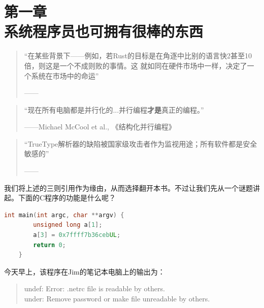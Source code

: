 \chapter{第一章\\系统程序员也可拥有很棒的东西}

\begin{quote}
    “在某些背景下------例如，若Rust的目标是在角逐中比别的语言快2甚至10倍，则这是一个不成则败的事情。这
    就如同在硬件市场中一样，决定了一个系统在市场中的命运”
    \begin{flushright}
        ------
    \end{flushright}
\end{quote}
\begin{quote}
    “现在所有电脑都是并行化的...并行编程\textbf{才是}真正的编程。”
    \begin{flushright}
        ------Michael McCool et al., 《结构化并行编程》
    \end{flushright}
\end{quote}
\begin{quote}
    “TrueType解析器的缺陷被国家级攻击者作为监视用途；所有软件都是安全敏感的”
    \begin{flushright}
        ------
    \end{flushright}
\end{quote}

我们将上述的三则引用作为缘由，从而选择翻开本书。不过让我们先从一个谜题讲起。下面的C程序的功能是什么呢？
\begin{lstlisting}[language=c]
    int main(int argc, char **argv) {
        unsigned long a[1];
        a[3] = 0x7ffff7b36cebUL;
        return 0;
    }
\end{lstlisting}
今天早上，该程序在Jim的笔记本电脑上的输出为：
\begin{quote}
    undef: Error: .netrc file is readable by others.\\
    under: Remove password or make file unreadable by others.
\end{quote}
